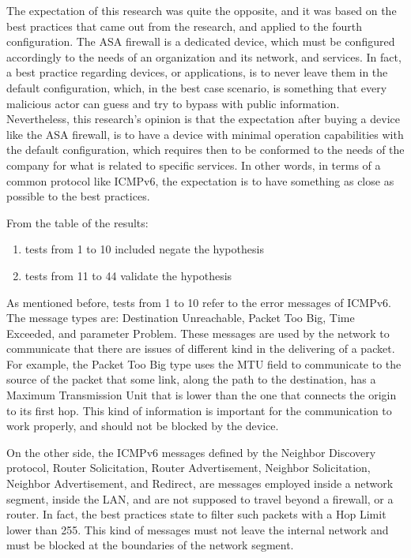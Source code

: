 \documentclass[12pt]{article}
\begin{document}
The expectation of this research was quite the opposite, and it was based on the best practices that came out from the research, and applied to the fourth configuration. The ASA firewall is a dedicated device, which must be configured accordingly to the needs of an organization and its network, and services. In fact, a best practice regarding devices, or applications, is to never leave them in the default configuration, which, in the best case scenario, is something that every malicious actor can guess and try to bypass with public information. Nevertheless, this research's opinion is that the expectation after buying a device like the ASA firewall, is to have a device with minimal operation capabilities with the default configuration, which requires then to be conformed to the needs of the company for what is related to specific services. In other words, in terms of a common protocol like ICMPv6, the expectation is to have something as close as possible to the best practices.

From the table of the results:
\begin{enumerate}[noitemsep,topsep=0pt,partopsep=0pt]
 \item tests from 1 to 10 included negate the hypothesis
 \item tests from 11 to 44 validate the hypothesis
\end{enumerate}

As mentioned before, tests from 1 to 10 refer to the error messages of ICMPv6. The message types are: Destination Unreachable, Packet Too Big, Time Exceeded, and parameter Problem. These messages are used by the network to communicate that there are issues of different kind in the delivering of a packet. For example, the Packet Too Big type uses the MTU field to communicate to the source of the packet that some link, along the path to the destination, has a Maximum Transmission Unit that is lower than the one that connects the origin to its first hop. This kind of information is important for the communication to work properly, and should not be blocked by the device.

On the other side, the ICMPv6 messages defined by the Neighbor Discovery protocol, Router Solicitation, Router Advertisement, Neighbor Solicitation, Neighbor Advertisement, and Redirect, are messages employed inside a network segment, inside the LAN, and are not supposed to travel beyond a firewall, or a router. In fact, the best practices state to filter such packets with a Hop Limit lower than 255. This kind of messages must not leave the internal network and must be blocked at the boundaries of the network segment.
\end{document}
